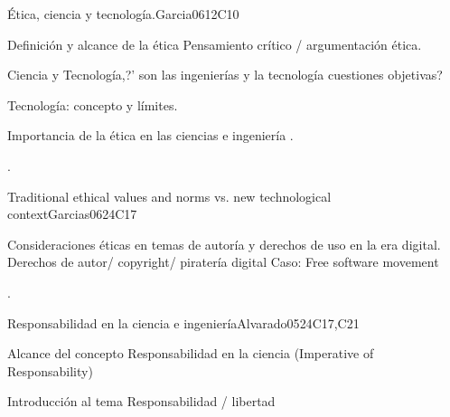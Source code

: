 \begin{syllabus}
\begin{unit}{Ética, ciencia y tecnología.}{}{Garcia06}{12}{C10}
   \begin{topics}
      \item Definición y alcance de la ética Pensamiento crítico /  argumentación ética.
      \item Ciencia y Tecnología,?' son las ingenierías y la tecnología cuestiones objetivas? 
      \item Tecnología: concepto y límites.
      \item Importancia de la ética en las ciencias e ingeniería .
   \end{topics}
   \begin{learningoutcomes}
      \item .
   \end{learningoutcomes}
\end{unit}

\begin{unit}{Traditional ethical values and norms vs. new technological context}{}{Garcias06}{24}{C17}
   \begin{topics}
      \item Consideraciones éticas en temas de autoría y derechos de uso en la era digital. Derechos de autor/ copyright/ piratería digital  Caso: Free software movement
   \end{topics}

   \begin{learningoutcomes}
      \item .
   \end{learningoutcomes}
\end{unit}
\begin{unit}{Responsabilidad en la ciencia e ingeniería}{}{Alvarado05}{24}{C17,C21}
   \begin{topics}
      \item Alcance del concepto  Responsabilidad en la ciencia (Imperative of Responsability)
      \item Introducción al tema Responsabilidad / libertad 
      \end{topics}


\end{unit}
\end{syllabus}
